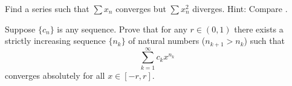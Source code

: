 \begin{exercise}
Find a series such that $\sum x_n$ converges but $\sum x_n^2$ diverges.
Hint: Compare .
\end{exercise}

\begin{exercise}
Suppose $\{ c_n \}$ is any sequence.  Prove that for any $r \in (0,1)$
there exists a strictly increasing sequence $\{ n_k \}$ of natural numbers ($n_{k+1} > n_k$) such that
\begin{equation*}
\sum_{k=1}^\infty c_k x^{n_k}
\end{equation*}
converges absolutely for all $x \in [-r,r]$.
\end{exercise}

